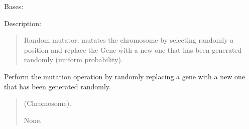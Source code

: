 \documentclass[letterpaper,10pt,english]{sphinxmanual}
\begin{document}
\begin{fulllineitems}
\label{\detokenize{pygenalgo.operators.mutation:pygenalgo.operators.mutation.random_mutator.RandomMutator}}
\pysigstartsignatures
{}
\pysigstopsignatures
\sphinxAtStartPar
Bases: {\hyperref[\detokenize{pygenalgo.operators.mutation:pygenalgo.operators.mutation.mutate_operator.MutationOperator}]{}}

\sphinxAtStartPar
Description:
\begin{quote}

\sphinxAtStartPar
Random mutator, mutates the chromosome by selecting randomly a position and replace
the Gene with a new one that has been generated randomly (uniform probability).
\end{quote}

\begin{fulllineitems}
\label{\detokenize{pygenalgo.operators.mutation:pygenalgo.operators.mutation.random_mutator.RandomMutator.mutate}}
\pysigstartsignatures
{}
\pysigstopsignatures
\sphinxAtStartPar
Perform the mutation operation by randomly replacing a gene
with a new one that has been generated randomly.
\begin{quote}\begin{description}
\sphinxAtStartPar
{} \textendash{} (Chromosome).

\sphinxAtStartPar
None.

\end{description}\end{quote}

\end{fulllineitems}


\end{fulllineitems}
\end{document}
